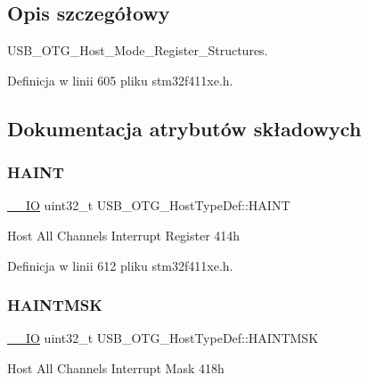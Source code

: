 \subsection{Opis szczegółowy}
U\+S\+B\+\_\+\+O\+T\+G\+\_\+\+Host\+\_\+\+Mode\+\_\+\+Register\+\_\+\+Structures. 

Definicja w linii 605 pliku stm32f411xe.\+h.



\subsection{Dokumentacja atrybutów składowych}
\mbox{\label{struct_u_s_b___o_t_g___host_type_def_af3c15285d6f2efdf4890ea5b27258aca}} 
\subsubsection{\texorpdfstring{H\+A\+I\+NT}{HAINT}}
{\footnotesize\ttfamily \hyperlink{core__sc300_8h_aec43007d9998a0a0e01faede4133d6be}{\+\_\+\+\_\+\+IO} uint32\+\_\+t U\+S\+B\+\_\+\+O\+T\+G\+\_\+\+Host\+Type\+Def\+::\+H\+A\+I\+NT}

Host All Channels Interrupt Register 414h 

Definicja w linii 612 pliku stm32f411xe.\+h.

\mbox{\label{struct_u_s_b___o_t_g___host_type_def_aa4ec75921a9699f77ee14f377e1b86dc}} 
\subsubsection{\texorpdfstring{H\+A\+I\+N\+T\+M\+SK}{HAINTMSK}}
{\footnotesize\ttfamily \hyperlink{core__sc300_8h_aec43007d9998a0a0e01faede4133d6be}{\+\_\+\+\_\+\+IO} uint32\+\_\+t U\+S\+B\+\_\+\+O\+T\+G\+\_\+\+Host\+Type\+Def\+::\+H\+A\+I\+N\+T\+M\+SK}

Host All Channels Interrupt Mask 418h 

